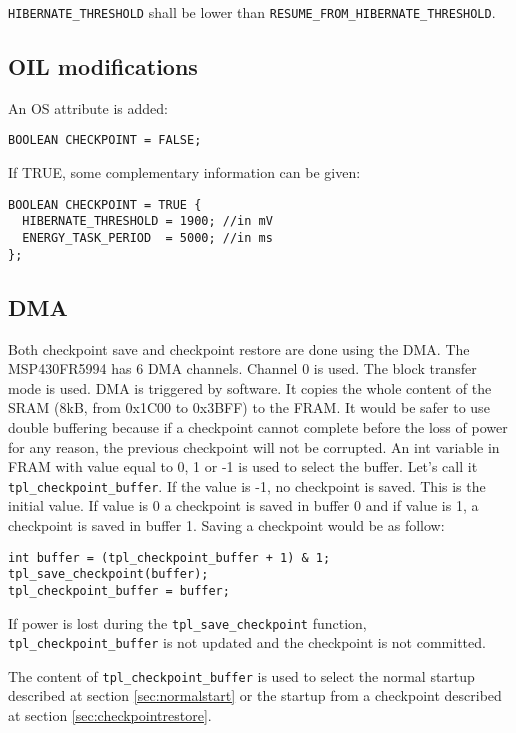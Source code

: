 \documentclass[11pt, oneside]{article}   	%
\begin{document}
\lstinline{HIBERNATE_THRESHOLD} shall be lower than \lstinline{RESUME_FROM_}\-\lstinline{HIBERNATE_THRESHOLD}.

\subsection{OIL modifications}

An OS attribute is added:

\begin{lstlisting}
BOOLEAN CHECKPOINT = FALSE;
\end{lstlisting}

If TRUE, some complementary information can be given:
\begin{lstlisting}
BOOLEAN CHECKPOINT = TRUE {
  HIBERNATE_THRESHOLD = 1900; //in mV
  ENERGY_TASK_PERIOD  = 5000; //in ms
};
\end{lstlisting}


\subsection{DMA}

Both checkpoint save and checkpoint restore are done using the DMA. The MSP430FR5994 has 6 DMA channels. Channel 0 is used. The block transfer mode is used. DMA is triggered by software. It copies the whole content of the SRAM (8kB, from 0x1C00 to 0x3BFF) to the FRAM. It would be safer to use double buffering because if a checkpoint cannot complete before the loss of power for any reason, the previous checkpoint will not be corrupted. An int variable in FRAM with value equal to 0, 1 or -1 is used to select the buffer. Let's call it \lstinline{tpl_checkpoint_buffer}. If the value is -1, no checkpoint is saved. This is the initial value. If value is 0 a checkpoint is saved in buffer 0 and if value is 1, a checkpoint is saved in buffer 1. Saving a checkpoint would be as follow: 

\begin{lstlisting}
int buffer = (tpl_checkpoint_buffer + 1) & 1;
tpl_save_checkpoint(buffer);
tpl_checkpoint_buffer = buffer;
\end{lstlisting}

If power is lost during the \lstinline{tpl_save_checkpoint} function, \lstinline{tpl_checkpoint_buffer} is not updated and the checkpoint is not committed. 

The content of \lstinline{tpl_checkpoint_buffer} is used to select the normal startup described at section \ref{sec:normalstart} or the startup from a checkpoint described at section \ref{sec:checkpointrestore}.
\end{document}
